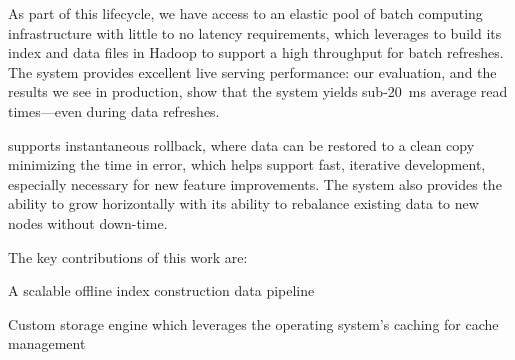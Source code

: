 As part of this lifecycle, we have access to an elastic pool of batch
computing infrastructure with little to no latency requirements, which
\projectname{} leverages to build its index and data files in Hadoop
to support a high throughput for batch refreshes. The system provides
excellent live serving performance: our evaluation, and the results we
see in production, show that the system yields sub-20~ms average read
times---even during data refreshes. 

\projectname{} supports instantaneous rollback, where data can be
restored to a clean copy minimizing the time in error, which helps
support fast, iterative development, especially necessary for new
feature improvements. The system also provides the ability to grow
horizontally with its ability to rebalance existing data to new nodes
without down-time. 

The key contributions of this work are:
\begin{compactitem}
\item A scalable offline index construction data pipeline 
\item Custom storage engine which leverages the operating system's
caching for cache management
\end{compactitem}

